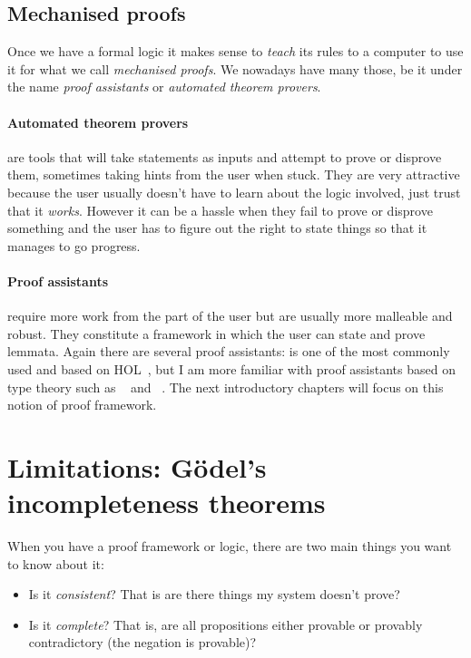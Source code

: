\subsection{Mechanised proofs}

Once we have a formal logic it makes sense to \emph{teach} its rules to a
computer to use it for what we call \emph{mechanised proofs}.
We nowadays have many those, be it under the name \emph{proof assistants} or
\emph{automated theorem provers}.

\paragraph{Automated theorem provers} are tools that will take statements as
inputs and attempt to prove or disprove them, sometimes taking hints from the
user when stuck.
They are very attractive because the user usually doesn't have to learn about
the logic involved, just trust that it \emph{works}. However it can be a hassle when they fail to prove or disprove
something and the user has to figure out the right to state things so that it
manages to go progress.

\paragraph{Proof assistants} require more work from the part of the user but are
usually more malleable and robust. They constitute a framework in which the user
can state and prove lemmata. Again there are several proof assistants: \IsaHOL
is one of the most commonly used and based on
\acrfull{HOL}~, but I am more  familiar with
proof assistants based on type theory such as \Coq~ and
\Agda~.
The next introductory chapters will focus on this notion of proof framework.

\section{Limitations: Gödel's incompleteness theorems}

When you have a proof framework or logic, there are two main things you want to
know about it:
\begin{itemize}
  \item Is it \emph{consistent}? That is are there things my system doesn't
  prove?
  \item Is it \emph{complete}? That is, are all propositions either provable
  or provably contradictory (\ie the negation is provable)?
\end{itemize}

